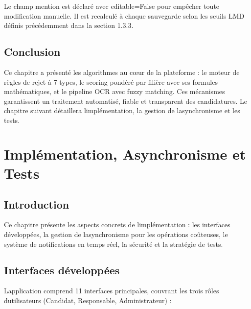 Le champ mention est déclaré avec editable=False pour empêcher toute
modification manuelle. Il est recalculé à chaque sauvegarde selon les
seuils LMD définis précédemment dans la section 1.3.3.

\section{Conclusion}

Ce chapitre a présenté les algorithmes au cœur de la plateforme : le
moteur de règles de rejet à 7 types, le scoring pondéré par filière avec
ses formules mathématiques, et le pipeline OCR avec fuzzy matching. Ces
mécanismes garantissent un traitement automatisé, fiable et transparent
des candidatures. Le chapitre suivant détaillera
l\textquotesingle implémentation, la gestion de
l\textquotesingle asynchronisme et les tests.

\chapter{Implémentation, Asynchronisme et
Tests}

\section{Introduction}

Ce chapitre présente les aspects concrets de
l\textquotesingle implémentation : les interfaces développées, la
gestion de l\textquotesingle asynchronisme pour les opérations
coûteuses, le système de notifications en temps réel, la sécurité et la
stratégie de tests.

\section{Interfaces
développées}

L\textquotesingle application comprend 11 interfaces principales,
couvrant les trois rôles d\textquotesingle utilisateurs (Candidat,
Responsable, Administrateur) :

